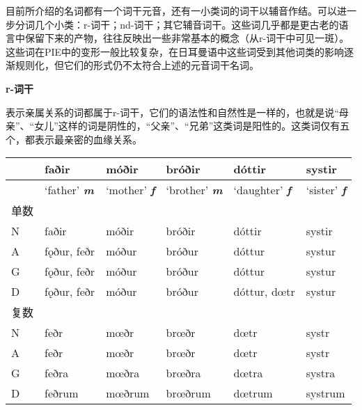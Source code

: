 目前所介绍的名词都有一个词干元音，还有一小类词的词干以辅音作结。可以进一步分词几个小类：r-词干；nd-词干；其它辅音词干。这些词几乎都是更古老的语言中保留下来的产物，往往反映出一些非常基本的概念（从r-词干中可见一斑）。这些词在PIE中的变形一般比较复杂，在日耳曼语中这些词受到其他词类的影响逐渐规则化，但它们的形式仍不太符合上述的元音词干名词。

\textbf{r-词干}

表示亲属关系的词都属于r-词干，它们的语法性和自然性是一样的，也就是说``母亲''、``女儿''这样的词是阴性的，``父亲''、``兄弟''这类词是阳性的。这类词仅有五个，都表示最亲密的血缘关系。

\begin{longtable}{llllll}
  \toprule
                    & faðir                        & móðir                      & bróðir    & dóttir       & systir  \\
  \midrule
  \endhead
  \bottomrule
  \endfoot
                    & `father' \emph{\textbf{m}}   & `mother' \emph{\textbf{f}} & `brother'
  \emph{\textbf{m}} & `daughter' \emph{\textbf{f}} & `sister'
  \emph{\textbf{f}}                                                                                                  \\
  单数                &                              &                            &           &              &         \\
  N                 & faðir                        & móðir                      & bróðir    & dóttir       & systir  \\
  A                 & fǫður, feðr                  & móður                      & bróður    & dóttur       & systur  \\
  G                 & fǫður, feðr                  & móður                      & bróður    & dóttur       & systur  \\
  D                 & fǫður, feðr                  & móður                      & bróður    & dóttur, dœtr & systur  \\
  复数                &                              &                            &           &              &         \\
  N                 & feðr                         & mœðr                       & brœðr     & dœtr         & systr   \\
  A                 & feðr                         & mœðr                       & brœðr     & dœtr         & systr   \\
  G                 & feðra                        & mœðra                      & brœðra    & dœtra        & systra  \\
  D                 & feðrum                       & mœðrum                     & brœðrum   & dœtrum       & systrum \\
\end{longtable}

